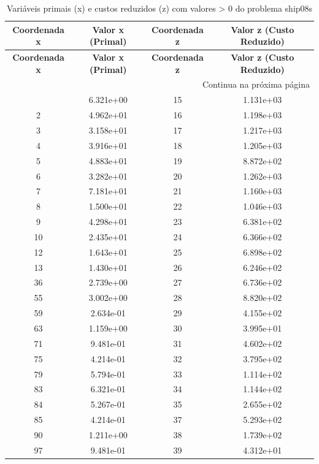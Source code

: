 \documentclass[12pt]{article}
\begin{document}
\begin{longtable}{@{}cccc@{}}
\caption{Variáveis primais (x) e custos reduzidos (z) com valores > 0 do problema ship08s} \\
\toprule
\textbf{Coordenada x} & \textbf{Valor x (Primal)} & \textbf{Coordenada z} & \textbf{Valor z (Custo Reduzido)} \\
\midrule
\endfirsthead

\toprule
\textbf{Coordenada x} & \textbf{Valor x (Primal)} & \textbf{Coordenada z} & \textbf{Valor z (Custo Reduzido)} \\
\midrule
\endhead

\midrule \multicolumn{4}{r}{{Continua na próxima página}} \\ \midrule
\endfoot

\bottomrule
\endlastfoot
1 & 6.321e+00 & 15 & 1.131e+03 \\
2 & 4.962e+01 & 16 & 1.198e+03 \\
3 & 3.158e+01 & 17 & 1.217e+03 \\
4 & 3.916e+01 & 18 & 1.205e+03 \\
5 & 4.883e+01 & 19 & 8.872e+02 \\
6 & 3.282e+01 & 20 & 1.262e+03 \\
7 & 7.181e+01 & 21 & 1.160e+03 \\
8 & 1.500e+01 & 22 & 1.046e+03 \\
9 & 4.298e+01 & 23 & 6.381e+02 \\
10 & 2.435e+01 & 24 & 6.366e+02 \\
12 & 1.643e+01 & 25 & 6.898e+02 \\
13 & 1.430e+01 & 26 & 6.246e+02 \\
36 & 2.739e+00 & 27 & 6.736e+02 \\
55 & 3.002e+00 & 28 & 8.820e+02 \\
59 & 2.634e-01 & 29 & 4.155e+02 \\
63 & 1.159e+00 & 30 & 3.995e+01 \\
71 & 9.481e-01 & 31 & 4.602e+02 \\
75 & 4.214e-01 & 32 & 3.795e+02 \\
79 & 5.794e-01 & 33 & 1.114e+02 \\
83 & 6.321e-01 & 34 & 1.144e+02 \\
84 & 5.267e-01 & 35 & 2.655e+02 \\
85 & 4.214e-01 & 37 & 5.293e+02 \\
90 & 1.211e+00 & 38 & 1.739e+02 \\
97 & 9.481e-01 & 39 & 4.312e+01 \\

\end{longtable}
\end{document}
